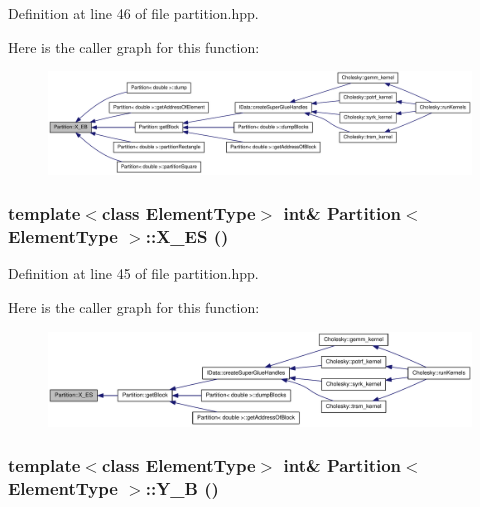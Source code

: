 Definition at line 46 of file partition.hpp.

Here is the caller graph for this function:\nopagebreak
\begin{figure}[H]
\begin{center}
\leavevmode
\includegraphics[width=420pt]{class_partition_aae132939e5651020e0801bec2009d300_icgraph}
\end{center}
\end{figure}
\hypertarget{class_partition_a8d2849bb3bbea837ceca021ce9d6257a}{
\subsubsection[{X\_\-ES}]{\setlength{\rightskip}{0pt plus 5cm}template$<$class ElementType$>$ int\& {\bf Partition}$<$ ElementType $>$::X\_\-ES ()}}
\label{class_partition_a8d2849bb3bbea837ceca021ce9d6257a}


Definition at line 45 of file partition.hpp.

Here is the caller graph for this function:\nopagebreak
\begin{figure}[H]
\begin{center}
\leavevmode
\includegraphics[width=396pt]{class_partition_a8d2849bb3bbea837ceca021ce9d6257a_icgraph}
\end{center}
\end{figure}
\hypertarget{class_partition_a99642b7ce0d0385ccbaa821918e816f0}{
\subsubsection[{Y\_\-B}]{\setlength{\rightskip}{0pt plus 5cm}template$<$class ElementType$>$ int\& {\bf Partition}$<$ ElementType $>$::Y\_\-B ()}}
\label{class_partition_a99642b7ce0d0385ccbaa821918e816f0}


